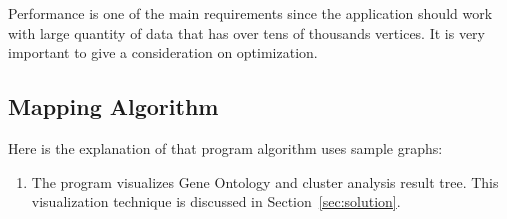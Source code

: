 Performance is one of the main requirements since the application should work with large quantity of data that has over tens of thousands vertices. It is very important to give a consideration on optimization.


\subsection{Mapping Algorithm}
\label{sec:mapping_algorithm}
Here is the explanation of that program algorithm uses sample graphs:
\begin{enumerate}

\item The program visualizes Gene Ontology and cluster analysis result tree. This visualization technique is discussed in Section~\ref{sec:solution}.


\end{enumerate}
